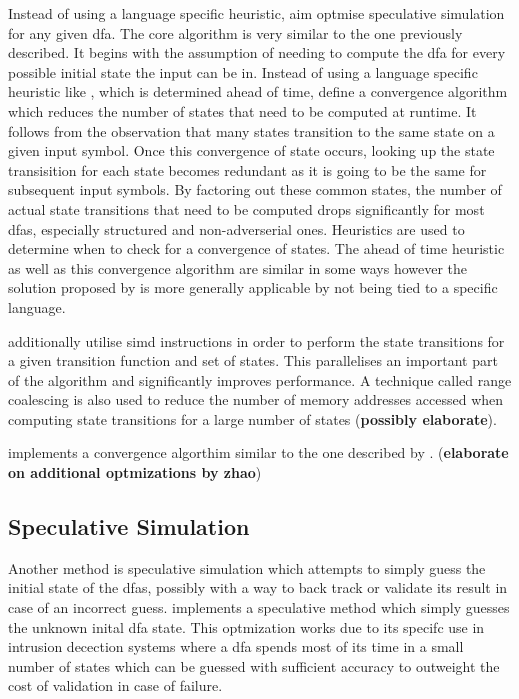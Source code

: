 Instead of using a language specific heuristic,
\cite{mytkowicz_data-parallel_2014} aim optmise speculative simulation for
any given \gls{dfa}. The core algorithm is very similar to the one previously
described. It begins with the assumption of needing to compute the \gls{dfa} for
every possible initial state the input can be in. Instead of using a language
specific heuristic like \cite{barenghi_parallel_2015}, which is determined ahead
of time, \cite{mytkowicz_data-parallel_2014} define a convergence algorithm
which reduces the number of states that need to be computed at runtime. It
follows from the observation that many states transition to the same state on a
given input symbol. Once this convergence of state occurs, looking up the state
transisition for each state becomes redundant as it is going to be the same
for subsequent input symbols. By factoring out these common states, the number
of actual state transitions that need to be computed drops significantly for
most \gls{dfa}s, especially structured and non-adverserial ones. Heuristics are
used to determine when to check for a  convergence of states. The ahead of time
heuristic as well as this convergence algorithm are similar in some ways however
the solution proposed by \cite{mytkowicz_data-parallel_2014} is more generally
applicable by not being tied to a specific language.

\cite{mytkowicz_data-parallel_2014} additionally utilise \gls{simd} instructions
in order to perform the state transitions for a given transition function
and set of states. This parallelises an important part of the algorithm and
significantly improves performance. A technique called range coalescing is also
used to reduce the number of memory addresses accessed when computing state
transitions for a large number of states (\textbf{possibly elaborate}).

\cite{zhao_--fly_2015} implements a convergence algorthim similar to the
one described by  \cite{mytkowicz_data-parallel_2014}. (\textbf{elaborate on
additional optmizations by zhao})

\subsection{Speculative Simulation} \label{speculative_simulation}

Another method is speculative simulation which attempts to simply guess the
initial state of the \gls{dfa}s, possibly with a way to back track or validate
its result in case of an incorrect guess. \cite{luchaup_multi-byte_2009,
luchaup_speculative_2011} implements a speculative method which simply guesses
the unknown inital \gls{dfa} state. This optmization works due to its specifc
use in intrusion decection systems where a \gls{dfa} spends most of its time
in a small number of states which can be guessed with sufficient accuracy to
outweight the cost of validation in case of failure.

